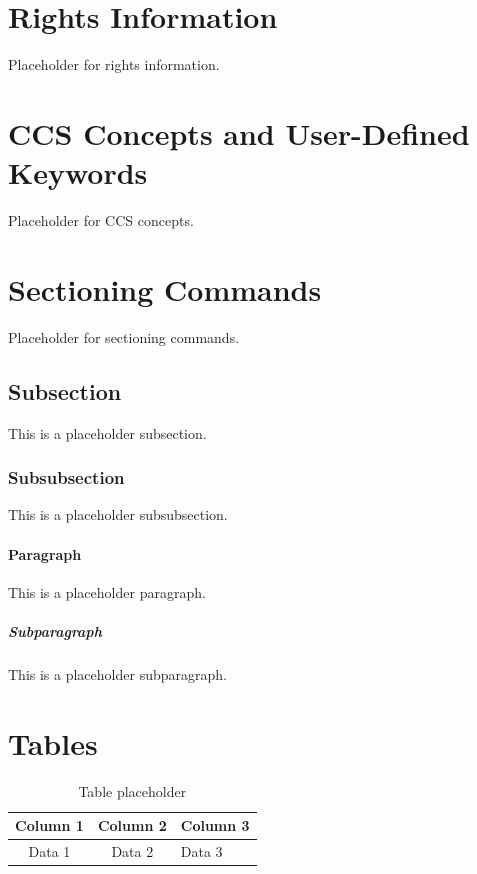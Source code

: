 \section{Rights Information}

Placeholder for rights information.

\section{CCS Concepts and User-Defined Keywords}

Placeholder for CCS concepts.

\section{Sectioning Commands}

Placeholder for sectioning commands.

\subsection{Subsection}
\label{sec:subsection}

This is a placeholder subsection.

\subsubsection{Subsubsection}
\label{sec:subsubsection}

This is a placeholder subsubsection.

\paragraph{Paragraph}

This is a placeholder paragraph.

\subparagraph{Subparagraph}

This is a placeholder subparagraph.

\section{Tables}

\begin{table}
  \caption{Table placeholder}
  \label{tab:freq}
  \begin{tabular}{ccl}
    \toprule
    Column 1 & Column 2 & Column 3 \\
    \midrule
    Data 1   & Data 2   & Data 3   \\
    \bottomrule
  \end{tabular}
\end{table}

